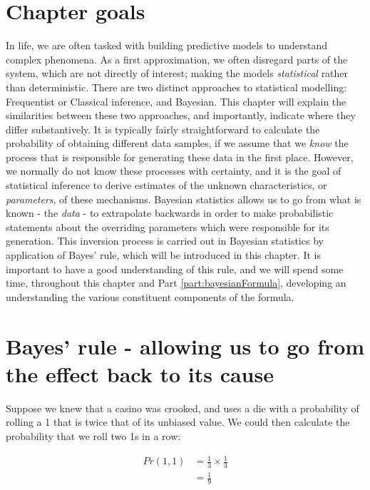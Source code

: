 \documentclass[11pt,fullpage]{book}
\begin{document}
\section{Chapter goals}
In life, we are often tasked with building predictive models to understand complex phenomena. As a first approximation, we often disregard parts of the system, which are not directly of interest; making the models \textit{statistical} rather than deterministic. There are two distinct approaches to statistical modelling: Frequentist or Classical inference, and Bayesian. This chapter will explain the similarities between these two approaches, and importantly, indicate where they differ substantively. It is typically fairly straightforward to calculate the probability of obtaining different data samples, if we assume that we \textit{know} the process that is responsible for generating these data in the first place. However, we normally do not know these processes with certainty, and it is the goal of statistical inference to derive estimates of the unknown characteristics, or \textit{parameters}, of these mechanisms. Bayesian statistics allows us to go from what is known - the \textit{data} - to extrapolate backwards in order to make probabilistic statements about the overriding parameters which were responsible for its generation. This inversion process is carried out in Bayesian statistics by application of Bayes' rule, which will be introduced in this chapter.  It is important to have a good understanding of this rule, and we will spend some time, throughout this chapter and Part \ref{part:bayesianFormula}, developing an understanding the various constituent components of the formula.

\section{Bayes' rule - allowing us to go from the effect back to its cause}\label{sec:Intro_bayesCauseEffect}
Suppose we knew that a casino was crooked, and uses a die with a probability of rolling a 1 that is twice that of its unbiased value. We could then calculate the probability that we roll two 1s in a row:

\begin{equation}\label{eq:Intro_crookedCasinoBayes}
\begin{align}
Pr(1,1) &= \frac{1}{3} \times \frac{1}{3}\\
&= \frac{1}{9}
\end{align}
\end{equation}
\end{document}

